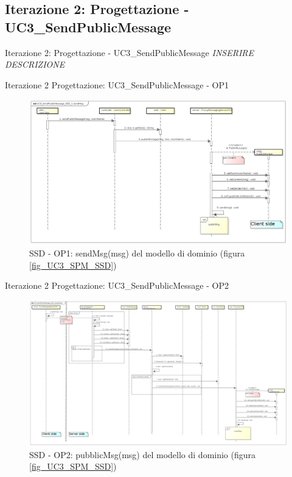 \documentclass[t]{beamer} %
\begin{document}
\subsection{Iterazione 2: Progettazione - UC3\_SendPublicMessage}
\begin{frame} {Iterazione 2: Progettazione - UC3\_SendPublicMessage}
  \emph{INSERIRE DESCRIZIONE}
\end{frame}

\begin{frame} {Iterazione 2 Progettazione: UC3\_SendPublicMessage - OP1}
   \begin{figure}
     \includegraphics[scale=0.24]{image_astah/Iteration_2_DesignModel/UC3_SendPublicMessage_SSD_1_sendMsg.png}{\centering}
     \caption{SSD - OP1: sendMsg(msg) del modello di dominio (figura \ref{fig_UC3_SPM_SSD}) }
     \label{fig_UC3_SSD_SRM_1} 
   \end{figure}
\end{frame}

\begin{frame} {Iterazione 2 Progettazione: UC3\_SendPublicMessage - OP2}
   \begin{figure}
     \includegraphics[scale=0.14]{image_astah/Iteration_2_DesignModel/UC3_SendPublicMessage_SSD_2_publicMsg.png}{\centering}
     \caption{SSD - OP2: pubblicMsg(msg) del modello di dominio (figura \ref{fig_UC3_SPM_SSD}) }
     \label{fig_UC3_SSD_SRM_2} 
   \end{figure}
\end{frame}
\end{document}
